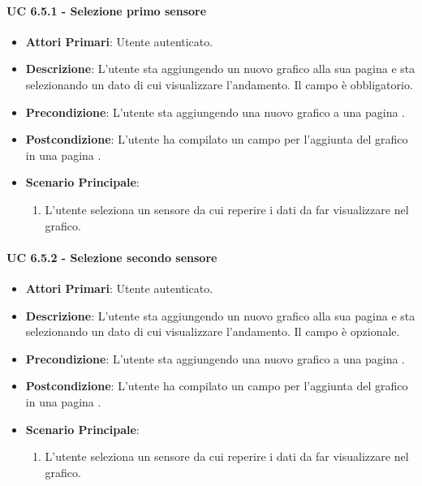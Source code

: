 			\paragraph{UC 6.5.1 - Selezione primo sensore}
			\begin{itemize}
				\item \textbf{Attori Primari}: Utente autenticato.
				\item \textbf{Descrizione}: L'utente sta aggiungendo un nuovo grafico alla sua pagina  e sta selezionando un dato di cui visualizzare l'andamento. Il campo è obbligatorio.
				\item \textbf{Precondizione}: L'utente sta aggiungendo una nuovo grafico a una pagina .
				\item \textbf{Postcondizione}: L'utente ha compilato un campo per l'aggiunta del grafico in una pagina .
				\item \textbf{Scenario Principale}:
				\begin{enumerate}
					\item{L'utente seleziona un sensore da cui reperire i dati da far visualizzare nel grafico.}
				\end{enumerate}	
			\end{itemize}

			\paragraph{UC 6.5.2 - Selezione secondo sensore}
			\begin{itemize}
				\item \textbf{Attori Primari}: Utente autenticato.
				\item \textbf{Descrizione}: L'utente sta aggiungendo un nuovo grafico alla sua pagina  e sta selezionando un dato di cui visualizzare l'andamento. Il campo è opzionale.
				\item \textbf{Precondizione}: L'utente sta aggiungendo una nuovo grafico a una pagina .
				\item \textbf{Postcondizione}: L'utente ha compilato un campo per l'aggiunta del grafico in una pagina .
				\item \textbf{Scenario Principale}:
				\begin{enumerate}
					\item{L'utente seleziona un sensore da cui reperire i dati da far visualizzare nel grafico.}
				\end{enumerate}	
			\end{itemize}

